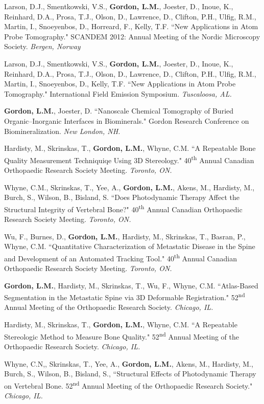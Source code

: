 Larson, D.J., Smentkowski, V.S., \textbf{Gordon, L.M.}, Joester, D., Inoue, K.,  Reinhard, D.A., Prosa, T.J., Olson, D., Lawrence, D., Clifton, P.H., Ulfig, R.M., Martin, I., Snoeyenbos, D., Horreard, F., Kelly, T.F. ``New Applications in Atom Probe Tomography." SCANDEM 2012: Annual Meeting of the Nordic Microscopy Society. \emph{Bergen, Norway}

Larson, D.J., Smentkowski, V.S., \textbf{Gordon, L.M.}, Joester, D., Inoue, K.,  Reinhard, D.A., Prosa, T.J., Olson, D., Lawrence, D., Clifton, P.H., Ulfig, R.M., Martin, I., Snoeyenbos, D.,  Kelly, T.F. ``New Applications in Atom Probe Tomography." International Field Emission Symposium. \emph{Tuscaloosa, AL.}

\textbf{Gordon, L.M.}, Joester, D. ``Nanoscale Chemical Tomography of Buried Organic--Inorganic Interfaces in Biominerals." Gordon Research Conference on Biomineralization. \emph{New London, NH.}

Hardisty, M., Skrinskas, T., \textbf{Gordon, L.M.}, Whyne, C.M. ``A Repeatable Bone Quality Measurement Techniquiqe Using 3D Stereology." 40\textsuperscript{th} Annual Canadian Orthopaedic Research Society Meeting. \emph{Toronto, ON.}

Whyne, C.M., Skrinskas, T., Yee, A., \textbf{Gordon, L.M.}, Akens, M., Hardisty, M., Burch, S., Wilson, B., Bisland, S. ``Does Photodynamic Therapy Affect the Structural Integrity of Vertebral Bone?" 40\textsuperscript{th} Annual Canadian Orthopaedic Research Society  Meeting. \emph{Toronto, ON.}

Wu, F., Burnes, D., \textbf{Gordon, L.M.}, Hardisty, M., Skrinskas, T., Basran, P., Whyne, C.M. ``Quantitative Characterization of Metastatic Disease in the Spine and Development of an Automated Tracking Tool." 40\textsuperscript{th} Annual Canadian Orthopaedic Research Society Meeting. \emph{Toronto, ON.}

\textbf{Gordon, L.M.}, Hardisty, M., Skrinskas, T., Wu, F., Whyne, C.M. ``Atlas-Based Segmentation in the Metastatic Spine via 3D Deformable Registration." 52\textsuperscript{nd} Annual Meeting of the Orthopaedic Research Society. \emph{Chicago, IL.}

Hardisty, M., Skrinskas, T., \textbf{Gordon, L.M.}, Whyne, C.M. ``A Repeatable Stereologic Method to Measure Bone Quality." 52\textsuperscript{nd} Annual Meeting of the Orthopaedic Research Society. \emph{Chicago, IL.}

Whyne, C.N,, Skrinskas, T., Yee, A., \textbf{Gordon, L.M.}, Akens, M., Hardisty, M., Burch, S., Wilson, B., Bisland, S., ``Structural Effects of Photodynamic Therapy on Vertebral Bone. 52\textsuperscript{nd} Annual Meeting of the Orthopaedic Research Society." \emph{Chicago, IL.}

